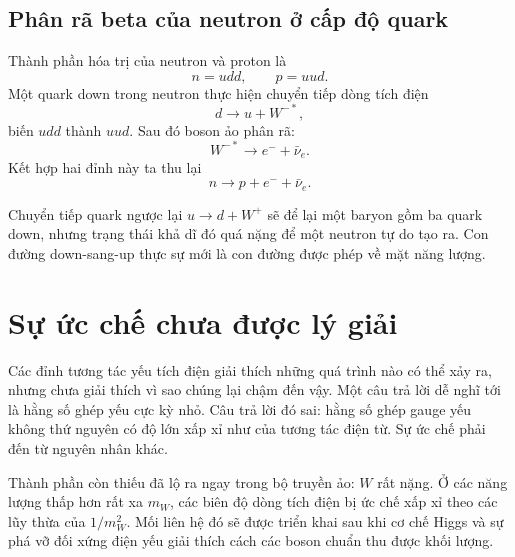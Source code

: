 \subsection{Phân rã beta của neutron ở cấp độ quark}

Thành phần hóa trị của neutron và proton là
\begin{equation}
n=udd,
\qquad
p=uud.
\end{equation}
Một quark down trong neutron thực hiện chuyển tiếp dòng tích điện
\begin{equation}
d\longrightarrow u+W^{-*},
\end{equation}
biến \(udd\) thành \(uud\). Sau đó boson ảo phân rã:
\begin{equation}
W^{-*}\longrightarrow e^-+\bar\nu_e.
\end{equation}
Kết hợp hai đỉnh này ta thu lại
\begin{equation}
n\longrightarrow p+e^-+\bar\nu_e.
\end{equation}

Chuyển tiếp quark ngược lại \(u\to d+W^+\) sẽ để lại một baryon gồm ba quark down, nhưng trạng thái khả dĩ đó quá nặng để một neutron tự do tạo ra. Con đường down-sang-up thực sự mới là con đường được phép về mặt năng lượng.

\begin{classroomqa}
\end{classroomqa}

\section{Sự ức chế chưa được lý giải}

Các đỉnh tương tác yếu tích điện giải thích những quá trình nào có thể xảy ra, nhưng chưa giải thích vì sao chúng lại chậm đến vậy. Một câu trả lời dễ nghĩ tới là hằng số ghép yếu cực kỳ nhỏ. Câu trả lời đó sai: hằng số ghép gauge yếu không thứ nguyên có độ lớn xấp xỉ như của tương tác điện từ. Sự ức chế phải đến từ nguyên nhân khác.

Thành phần còn thiếu đã lộ ra ngay trong bộ truyền ảo: \(W\) rất nặng. Ở các năng lượng thấp hơn rất xa \(m_W\), các biên độ dòng tích điện bị ức chế xấp xỉ theo các lũy thừa của \(1/m_W^2\). Mối liên hệ đó sẽ được triển khai sau khi cơ chế Higgs và sự phá vỡ đối xứng điện yếu giải thích cách các boson chuẩn thu được khối lượng.

